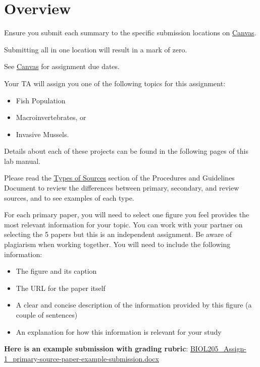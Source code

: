 \documentclass[
]{book}
\providecommand{\tightlist}{%
  \setlength{\itemsep}{0pt}\setlength{\parskip}{0pt}}
\begin{document}
\hypertarget{overview}{%
\section*{Overview}\label{overview}}

Ensure you submit each summary to the specific submission locations on \href{https://canvas.ubc.ca/courses/113910}{Canvas}.

Submitting all in one location will result in a mark of zero.

See \href{https://canvas.ubc.ca}{Canvas} for assignment due dates.

Your TA will assign you one of the following topics for this assignment:

\begin{itemize}
\tightlist
\item
  Fish Population
\item
  Macroinvertebrates, or
\item
  Invasive Mussels.
\end{itemize}

Details about each of these projects can be found in the following pages of this lab manual.

Please read the \href{https://ubco-biology.github.io/Procedures-and-Guidelines/types-of-sources.html}{Types of Sources} section of the Procedures and Guidelines Document to review the differences between primary, secondary, and review sources, and to see examples of each type.

For each primary paper, you will need to select one figure you feel provides the most relevant information for your topic. You can work with your partner on selecting the 5 papers but this is an independent assignment. Be aware of plagiarism when working together. You will need to include the following information:

\begin{itemize}
\tightlist
\item
  The figure and its caption
\item
  The URL for the paper itself
\item
  A clear and concise description of the information provided by this figure (a couple of sentences)
\item
  An explanation for how this information is relevant for your study
\end{itemize}

\textbf{Here is an example submission with grading rubric}: \href{https://osf.io/download/93rpn}{BIOL205\_Assign-1\_primary-source-paper-example-submission.docx}
\end{document}
